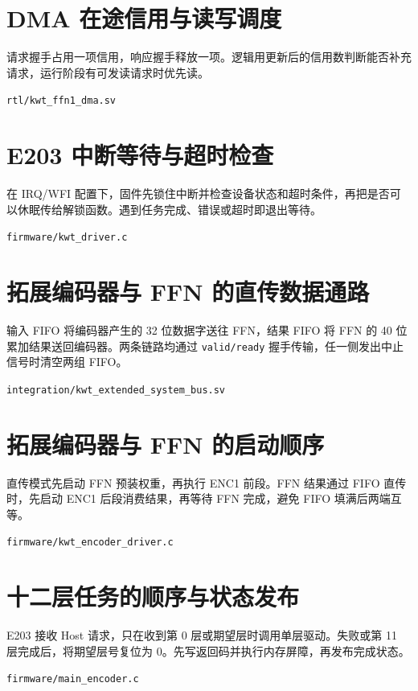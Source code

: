 \documentclass[UTF8,a4paper,zihao=-4,fontset=none,openany,oneside]{ctexrep}
\begin{document}
\clearpage
\section{DMA 在途信用与读写调度}
请求握手占用一项信用，响应握手释放一项。逻辑用更新后的信用数判断能否补充请求，运行阶段有可发读请求时优先读。
\par\noindent\texttt{rtl/kwt\_ffn1\_dma.sv}


\clearpage
\section{E203 中断等待与超时检查}
在 IRQ/WFI 配置下，固件先锁住中断并检查设备状态和超时条件，再把是否可以休眠传给解锁函数。遇到任务完成、错误或超时即退出等待。
\par\noindent\texttt{firmware/kwt\_driver.c}


\clearpage
\section{拓展编码器与 FFN 的直传数据通路}
输入 FIFO 将编码器产生的 32 位数据字送往 FFN，结果 FIFO 将 FFN 的 40 位累加结果送回编码器。两条链路均通过 \texttt{valid/ready} 握手传输，任一侧发出中止信号时清空两组 FIFO。
\par\noindent\texttt{integration/kwt\_extended\_system\_bus.sv}


\section{拓展编码器与 FFN 的启动顺序}
直传模式先启动 FFN 预装权重，再执行 ENC1 前段。FFN 结果通过 FIFO 直传时，先启动 ENC1 后段消费结果，再等待 FFN 完成，避免 FIFO 填满后两端互等。
\par\noindent\texttt{firmware/kwt\_encoder\_driver.c}


\clearpage
\section{十二层任务的顺序与状态发布}
E203 接收 Host 请求，只在收到第 0 层或期望层时调用单层驱动。失败或第 11 层完成后，将期望层号复位为 0。先写返回码并执行内存屏障，再发布完成状态。
\par\noindent\texttt{firmware/main\_encoder.c}

\end{document}
